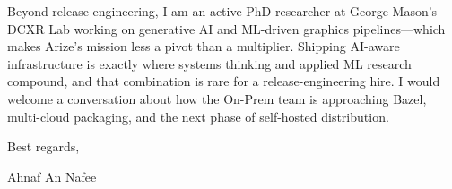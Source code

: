 \documentclass[letterpaper,11pt]{article}
\begin{document}
Beyond release engineering, I am an active PhD researcher at George Mason's DCXR Lab working on generative AI and ML-driven graphics pipelines---which makes Arize's mission less a pivot than a multiplier. Shipping AI-aware infrastructure is exactly where systems thinking and applied ML research compound, and that combination is rare for a release-engineering hire. I would welcome a conversation about how the On-Prem team is approaching Bazel, multi-cloud packaging, and the next phase of self-hosted distribution.

Best regards,

\vspace{18pt}
Ahnaf An Nafee
\end{document}
